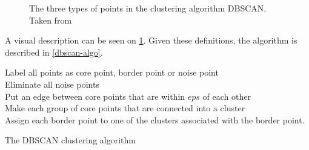\begin{figure}
\caption{The three types of points in the clustering algorithm DBSCAN. Taken from \cite[page 528]{pang2006introduction}}
\label{dbscan_point_types}
\end{figure}

A visual description can be seen on \cref{dbscan_point_types}.
Given these definitions, the algorithm is described in \cref{dbscan-algo}.

\begin{algorithm}
Label all points as core point, border point or noise point \\
Eliminate all noise points \\
Put an edge between core points that are within $ eps $ of each other \\
Make each group of core points that are connected into a cluster \\
Assign each border point to one of the clusters associated with the border point. 
\caption{The DBSCAN clustering algorithm}\label{dbscan-algo}
\end{algorithm}

